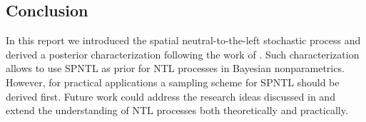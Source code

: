 \subsection{Conclusion}\label{conclusion}
In this report we introduced the spatial neutral-to-the-left stochastic process and derived a posterior characterization following the work of \cite{james2006poisson}. Such characterization allows to use SPNTL as prior for NTL processes in Bayesian nonparametrics. However, for practical applications a sampling scheme for SPNTL should be derived first. Future work could address the research ideas discussed in  and extend the understanding of NTL processes both theoretically and practically.
